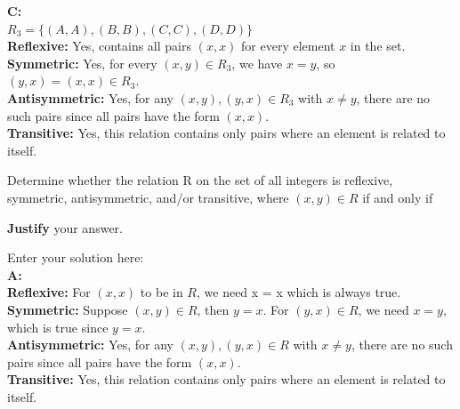 \documentclass[10pt]{exam}
\begin{document}
\begin{questions}
\begin{solution}
    \textbf{C:}\\
    $R_3 = \{(A,A), (B,B), (C,C), (D,D)\}$\\
    \textbf{Reflexive:} Yes, contains all pairs $(x,x)$ for every element $x$ in the set.\\
    \textbf{Symmetric:} Yes, for every $(x,y) \in R_3$, we have $x = y$, so $(y,x) = (x,x) \in R_3$.\\
    \textbf{Antisymmetric:} Yes, for any $(x,y), (y,x) \in R_3$ with $x \neq y$, there are no such pairs since all pairs have the form $(x,x)$.\\
    \textbf{Transitive:} Yes, this relation contains only pairs where an element is related to itself.
\end{solution}

\question[12] Determine whether the relation R on the set of all integers is reflexive, symmetric, antisymmetric, and/or transitive, where $(x,y) \in R$ if and only if


\textbf{Justify} your answer.
\begin{solution}
    Enter your solution here:\\
    \textbf{A:}\\
    \textbf{Reflexive:} For $(x,x)$ to be in $R$, we need x = x which is always true.\\
    \textbf{Symmetric:} Suppose $(x, y) \in R$, then $y = x$. For $(y, x) \in R$, we need $x = y$, which is true since $y = x$.\\
    \textbf{Antisymmetric:} Yes, for any $(x,y), (y,x) \in R$ with $x \neq y$, there are no such pairs since all pairs have the form $(x,x)$.\\
    \textbf{Transitive:} Yes, this relation contains only pairs where an element is related to itself.\\   
    

\end{solution}
\end{questions}
\end{document}
